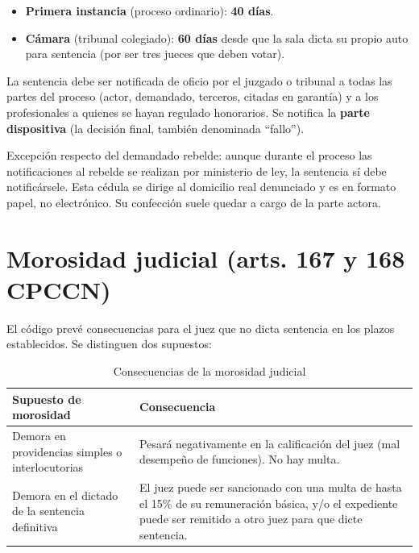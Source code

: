 \documentclass[12pt,oneside]{book}
\begin{document}
\begin{itemize}
    \item \textbf{Primera instancia} (proceso ordinario): \textbf{40 días}.
    \item \textbf{Cámara} (tribunal colegiado): \textbf{60 días} desde que la sala dicta su propio auto para sentencia (por ser tres jueces que deben votar).
\end{itemize}

La sentencia debe ser notificada de oficio por el juzgado o tribunal a todas las partes del proceso (actor, demandado, terceros, citadas en garantía) y a los profesionales a quienes se hayan regulado honorarios. Se notifica la \textbf{parte dispositiva} (la decisión final, también denominada ``fallo'').

\begin{note}
Excepción respecto del demandado rebelde: aunque durante el proceso las notificaciones al rebelde se realizan por ministerio de ley, la sentencia sí debe notificársele. Esta cédula se dirige al domicilio real denunciado y es en formato papel, no electrónico. Su confección suele quedar a cargo de la parte actora.
\end{note}

\section{Morosidad judicial (arts. 167 y 168 CPCCN)}

El código prevé consecuencias para el juez que no dicta sentencia en los plazos establecidos. Se distinguen dos supuestos:

\begin{table}[H]
\centering
\begin{tabularx}{\textwidth}{
    >{\raggedright\arraybackslash}p{}
    >{\raggedright\arraybackslash}X
}
\toprule
\textbf{Supuesto de morosidad} & \textbf{Consecuencia} \\
\midrule
Demora en providencias simples o interlocutorias & Pesará negativamente en la calificación del juez (mal desempeño de funciones). No hay multa. \\
\addlinespace
Demora en el dictado de la sentencia definitiva & El juez puede ser sancionado con una multa de hasta el 15\% de su remuneración básica, y/o el expediente puede ser remitido a otro juez para que dicte sentencia. \\
\bottomrule
\end{tabularx}
\caption{Consecuencias de la morosidad judicial}
\end{table}
\end{document}
